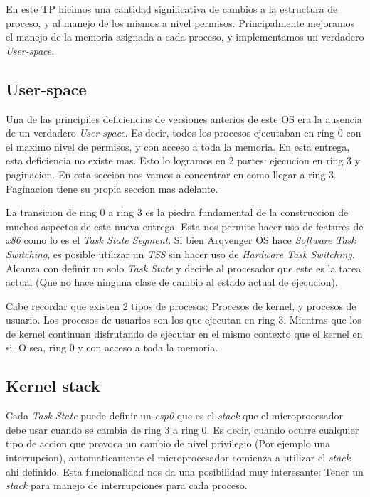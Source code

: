 \documentclass[a4paper,10pt]{article}
\begin{document}
En este TP hicimos una cantidad significativa de cambios a la estructura de proceso, y al manejo de los mismos a nivel permisos.
Principalmente mejoramos el manejo de la memoria asignada a cada proceso, y implementamos un verdadero \textit{User-space}.

\subsection{User-space}
Una de las principiles deficiencias de versiones anterios de este OS era la ausencia de un verdadero \textit{User-space}.
Es decir, todos los procesos ejecutaban en ring 0 con el maximo nivel de permisos, y con acceso a toda la memoria.
En esta entrega, esta deficiencia no existe mas.
Esto lo logramos en 2 partes: ejecucion en ring 3 y paginacion.
En esta seccion nos vamos a concentrar en como llegar a ring 3. 
Paginacion tiene su propia seccion mas adelante.

La transicion de ring 0 a ring 3 es la piedra fundamental de la construccion de muchos aspectos de esta nueva entrega.
Esta nos permite hacer uso de features de \textit{x86} como lo es el \textit{Task State Segment}.
Si bien Arqvenger OS hace \textit{Software Task Switching}, es posible utilizar un \textit{TSS} sin hacer uso de \textit{Hardware Task Switching}.
Alcanza con definir un solo \textit{Task State} y decirle al procesador que este es la tarea actual (Que no hace ninguna clase de cambio al estado actual de ejecucion).

Cabe recordar que existen 2 tipos de procesos: Procesos de kernel, y procesos de usuario.
Los procesos de usuarios son los que ejecutan en ring 3.
Mientras que los de kernel continuan disfrutando de ejecutar en el mismo contexto que el kernel en si.
O sea, ring 0 y con acceso a toda la memoria.

\subsection{Kernel stack}

Cada \textit{Task State} puede definir un \textit{esp0} que es el \textit{stack} que el microprocesador debe usar cuando se cambia de ring 3 a ring 0.
Es decir, cuando ocurre cualquier tipo de accion que provoca un cambio de nivel privilegio (Por ejemplo una interrupcion), automaticamente el microprocesador comienza a utilizar el \textit{stack} ahi definido.
Esta funcionalidad nos da una posibilidad muy interesante: Tener un \textit{stack} para manejo de interrupciones para cada proceso.
\end{document}
